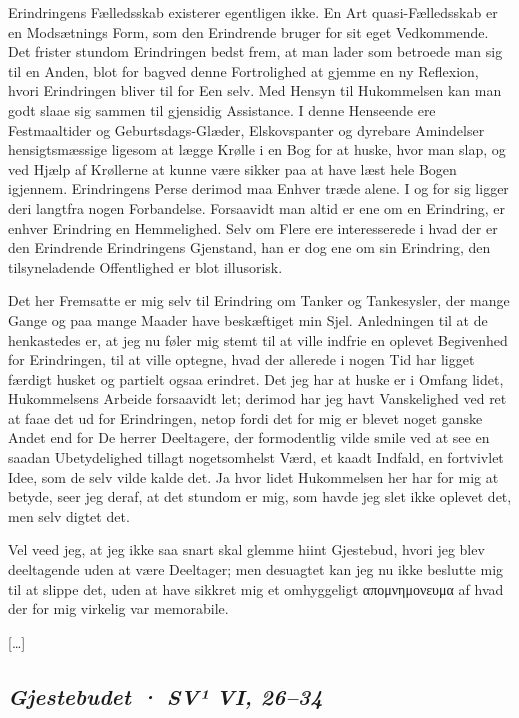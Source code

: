 \documentclass[12pt,a4paper]{article}
\newcommand{\sectionheading}[1]{\subsection*{\normalfont\itshape #1}}
\begin{document}
Erindringens Fælledsskab existerer egentligen ikke. En Art quasi-Fælledsskab er en Modsætnings Form, som den Erindrende bruger for sit eget Vedkommende. Det frister stundom Erindringen bedst frem, at man lader som betroede man sig til en Anden, blot for bagved denne Fortrolighed at gjemme en ny Reflexion, hvori Erindringen bliver til for Een selv. Med Hensyn til Hukommelsen kan man godt slaae sig sammen til gjensidig Assistance. I denne Henseende ere Festmaaltider og Geburtsdags-Glæder, Elskovspanter og dyrebare Amindelser hensigtsmæssige ligesom at lægge Krølle i en Bog for at huske, hvor man slap, og ved Hjælp af Krøllerne at kunne være sikker paa at have læst hele Bogen igjennem. Erindringens Perse derimod maa Enhver træde alene. I og for sig ligger deri langtfra nogen Forbandelse. Forsaavidt man altid er ene om en Erindring, er enhver Erindring en Hemmelighed. Selv om Flere ere interesserede i hvad der er den Erindrende Erindringens Gjenstand, han er dog ene om sin Erindring, den tilsyneladende Offentlighed er blot illusorisk.

Det her Fremsatte er mig selv til Erindring om Tanker og Tankesysler, der mange Gange og paa mange Maader have beskæftiget min Sjel. Anledningen til at de henkastedes er, at jeg nu føler mig stemt til at ville indfrie en oplevet Begivenhed for Erindringen, til at ville optegne, hvad der allerede i nogen Tid har ligget færdigt husket og partielt ogsaa erindret. Det jeg har at huske er i Omfang lidet, Hukommelsens Arbeide forsaavidt let; derimod har jeg havt Vanskelighed ved ret at faae det ud for Erindringen, netop fordi det for mig er blevet noget ganske Andet end for De herrer Deeltagere, der formodentlig vilde smile ved at see en saadan Ubetydelighed tillagt nogetsomhelst Værd, et kaadt Indfald, en fortvivlet Idee, som de selv vilde kalde det. Ja hvor lidet Hukommelsen her har for mig at betyde, seer jeg deraf, at det stundom er mig, som havde jeg slet ikke oplevet det, men selv digtet det.

Vel veed jeg, at jeg ikke saa snart skal glemme hiint Gjestebud, hvori jeg blev deeltagende uden at være Deeltager; men desuagtet kan jeg nu ikke beslutte mig til at slippe det, uden at have sikkret mig et omhyggeligt απομνημονευμα af hvad der for mig virkelig var memorabile.

[…]

\sectionheading{Gjestebudet  ·  SV¹ VI, 26–34}
\end{document}
